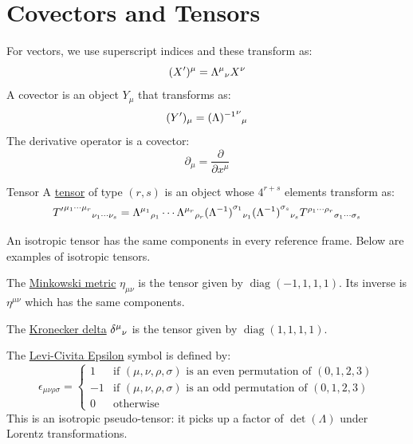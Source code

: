 \documentclass[../Main.tex]{subfiles}
\begin{document}
\section{Covectors and Tensors}
For vectors, we use superscript indices and these transform as:
\begin{equation*}
    (X')^\mu = \indx{\Lambda}{\mu}{\nu} X^\nu
\end{equation*}
A covector is an object $Y_\mu$ that transforms as:
\begin{equation*}
    (Y')_\mu = \indx{(\Lambda)^{-1}}{\nu}{\mu}
\end{equation*}
The derivative operator is a covector:
\begin{equation*}
    \partial_\mu = \frac{\partial}{\partial x^\mu}
\end{equation*}
\begin{definition}{Tensor}
    A \underline{tensor} of type $(r, s)$ is an object whose $4^{r + s}$ elements transform as:
    \begin{equation*}
        \indx{T'}{\mu_1\cdots\mu_r}{\nu_1\cdots\nu_s} = \indx{\Lambda}{\mu_1}{\rho_1}\cdots\indx{\Lambda}{\mu_r}{\rho_r}\indx{(\Lambda^{-1})}{\sigma_1}{\nu_1}\indx{(\Lambda^{-1})}{\sigma_s}{\nu_s}\indx{T}{\rho_1\cdots\rho_r}{\sigma_1\cdots\sigma_s}
    \end{equation*}
\end{definition}
An isotropic tensor has the same components in every reference frame. Below are examples of isotropic tensors.

The \underline{Minkowski metric} $\eta_{\mu\nu}$ is the tensor given by $\operatorname{diag}(-1, 1, 1, 1)$. Its inverse is $\eta^{\mu\nu}$ which has the same components.

The \underline{Kronecker delta} $\indx{\delta}{\mu}{\nu}$ is the tensor given by $\operatorname{diag}(1, 1, 1, 1)$.

The \underline{Levi-Civita Epsilon} symbol is defined by:
\begin{equation*}
    \epsilon_{\mu\nu\rho\sigma} =
    \begin{cases}
        1 & \text{if $(\mu, \nu, \rho, \sigma)$ is an even permutation of $(0, 1, 2, 3)$} \\
        -1 & \text{if $(\mu, \nu, \rho, \sigma)$ is an odd permutation of $(0, 1, 2, 3)$} \\
        0 & \text{otherwise}
    \end{cases}
\end{equation*}
This is an isotropic pseudo-tensor: it picks up a factor of $\det(\Lambda)$ under Lorentz transformations.
\end{document}
